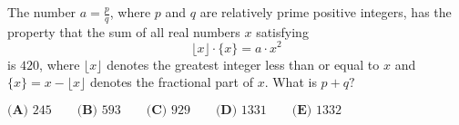 The number $a = \tfrac{p}{q}$, where $p$ and $q$ are relatively prime positive integers, has the property that the sum of all real numbers $x$ satisfying $$\lfloor x \rfloor \cdot \{x\} = a \cdot x^2$$ is $420$, where $\lfloor x \rfloor$ denotes the greatest integer less than or equal to $x$ and $\{x\} = x - \lfloor x \rfloor$ denotes the fractional part of $x$. What is $p + q?$

$\textbf{(A) } 245 \qquad \textbf{(B) } 593 \qquad \textbf{(C) } 929 \qquad \textbf{(D) } 1331 \qquad \textbf{(E) } 1332$